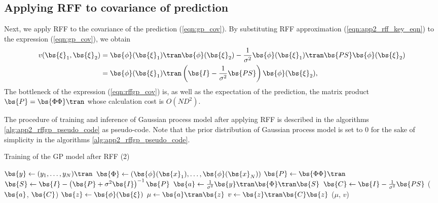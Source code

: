 \documentclass[twocolumn,a4paper,10pt]{article}
\begin{document}
\subsection{Applying RFF to covariance of prediction}

Next, we apply RFF to the covariance of the prediction (\ref{eqn:gp_cov}).
By substituting RFF approximation (\ref{eqn:app2_rff_key_eqn}) to the expression (\ref{eqn:gp_cov}),
we obtain
\begin{align}
    v (\bs{\xi}_1, \bs{\xi}_2)
    & = \bs{\phi} (\bs{\xi}_1)\tran \bs{\phi} (\bs{\xi}_2)
    - \frac{1}{\sigma^2} \bs{\phi} (\bs{\xi}_1)\tran \bs{PS} \bs{\phi} (\bs{\xi}_2) \notag \\
    & = \bs{\phi} (\bs{\xi}_1)\tran
    \left( \bs{I} - \frac{1}{\sigma^2} \bs{PS} \right)
    \bs{\phi} (\bs{\xi}_2),
    \label{eqn:app2_rffgp_cov}
\end{align}
The bottleneck of the expression (\ref{eqn:rffgp_cov}) is, as well as the expectation of the
prediction, the matrix product $\bs{P} = \bs{\Phi \Phi}\tran$ whose calculation cost is $O(ND^2)$.

The procedure of training and inference of Gaussian process model after applying RFF is
described in the algorithms \ref{alg:app2_rffgp_pseudo_code} as pseudo-code.
Note that the prior distribution of Gaussian process model is set to 0 for the sake of
simplicity in the algorithms \ref{alg:app2_rffgp_pseudo_code}.

\begin{algorithm}[h]
    \caption{Training of the GP model after RFF (2)}
    \label{alg:app2_rffgp_pseudo_code}
    \begin{algorithmic}[1]
        \State $\bs{y} \gets (y_1, \ldots, y_N)\tran$
        \State $\bs{\Phi} \gets (\bs{\phi}(\bs{x}_1), \ldots, \bs{\phi}(\bs{x}_N))$
        \State $\bs{P} \gets \bs{\Phi\Phi}\tran$
        \State $\bs{S} \gets \bs{I} - \left( \bs{P} + \sigma^2 \bs{I} \right)^{-1} \bs{P}$
        \State $\bs{a} \gets \frac{1}{\sigma^2} \bs{y}\tran \bs{\Phi}\tran \bs{S}$
        \State $\bs{C} \gets \bs{I} - \frac{1}{\sigma^2} \bs{PS}$
        \State \Return ($\bs{a}$, $\bs{C}$)
    \EndFunction
    \State
        \State $\bs{z} \gets \bs{\phi}(\bs{\xi})$
        \State $\mu \gets \bs{a}\tran \bs{z}$
        \State $v \gets \bs{z}\tran \bs{C} \bs{z}$
        \State \Return ($\mu$, $v$)
    \EndFunction
    \end{algorithmic}
\end{algorithm}
\end{document}
